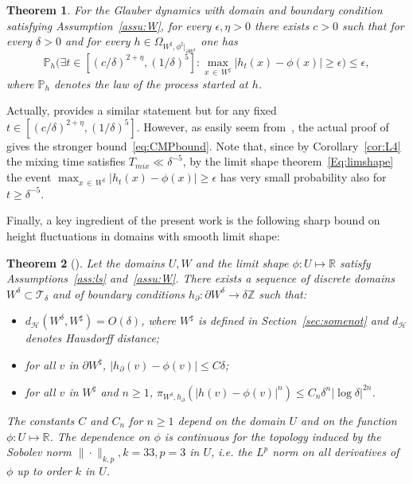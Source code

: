\documentclass[10pt]{amsart}
\newtheorem{theo}{Theorem}[section]
\theoremstyle{definition}\newtheorem{defi}[theo]{Definition}\newtheorem{rema}[theo]{Remark}\newtheorem{exam}[theo]{Example}\newtheorem{exem}[theo]{Example}\newtheorem{nota}[theo]{Notation}
\newcommand{\R}{\mathbb{R}}
\newcommand{\Z}{\mathbb{Z}}
\renewcommand{\P}{\mathbb{P}}
\newcommand{\clT}{\mathcal{T}}
\newcommand{\clH}{\mathcal{H}}
\renewcommand{\d}{{\sharp }}
\let\oldexists\exists
\renewcommand*{\exists}{\mathrel{\oldexists}}
\begin{document}
\begin{theo}\label{thm:CMPbound}
For the Glauber dynamics with domain and boundary condition satisfying Assumption~\ref{assu:W}, for every $\epsilon,\eta>0$ there exists $c>0$ such that for every $\delta>0$ and for every $h\in\Omega_{W^\d,\phi^\d|_{\partial W^\d}}$ one has
\begin{equation}\label{eq:CMPbound}
\P_{h}\Big(\exists t\in \left[(c/\delta)^{2+\eta},(1/\delta)^5\right] :\max_{x\,\in\,W^\d}\left|h_t(x)-\phi(x)\right|\ge \epsilon\Big)\le \epsilon,
\end{equation}
where $\P_h$ denotes the law of the process started at $h$.
\end{theo}

Actually, \cite[Th.~3.1]{LT_cmp} provides a similar statement but for any fixed $t\in [(c/\delta)^{2+\eta},(1/\delta)^5]$. However, as easily seem from~\cite[Claim~6.1]{LT_cmp}, the actual proof of~\cite[Th.~3.1]{LT_cmp} gives the stronger bound~\eqref{eq:CMPbound}. Note that, since by Corollary~\ref{cor:L4} the mixing time satisfies $T_{mix}\ll \delta^{-5}$, by the limit shape theorem~\eqref{Eq:limshape} the event $\max_{x\,\in\,W^\d}|h_t(x)-\phi(x)|\ge \epsilon$ has very small probability also for $t\ge \delta^{-5}$.

Finally, a key ingredient of the present work is the following sharp bound on height fluctuations in domains with smooth limit shape:

\begin{theo}[{\cite[Prop.~1.2-1.4]{L_arxiv}\label{prop:fluctuations_reference}}]
Let the domains $U,W$ and the limit shape $\phi:U\mapsto \R$ satisfy Assumptions~\ref{ass:ls} and~\ref{assu:W}. There exists a sequence of discrete domains $W^\delta\subset \clT_\delta$ and of boundary conditions $h_\partial:\partial W^\delta\to \delta\Z$ such that:
\begin{itemize}
\item $d_{\clH}(W^\delta,W^\d)=O(\delta)$, where $W^\d$ is defined in Section~\ref{sec:somenot} and $d_{\clH}$ denotes Hausdorff distance;
\item for all $v$ in $\partial W^\d$, $ | h_\partial(v) - \phi(v) | \leq C \delta $;
\item for all $v$ in $W^\d$ and $n\geq 1$, $\pi_{W^\delta,h_\partial}(|h(v) -\phi(v)
|^n ) \leq C_n \delta^n |\log\delta|^{2n}$.
\end{itemize}
The constants $C$ and $C_n$ for $n \geq 1$ depend on the domain $U$ and on the function $\phi:U\mapsto
\R$. The dependence on $\phi$ is continuous for the topology induced by the Sobolev norm $\|\cdot\|_{k,p},k=33,p=3$ in $U$, i.e. the $L^p$ norm on all derivatives of $\phi$ up to order $k$ in $U$.\label{th:33}
\end{theo}
\end{document}
